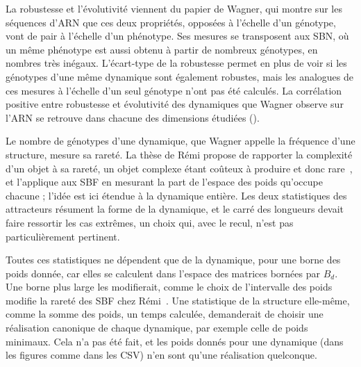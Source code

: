 \documentclass[12pt, a4paper]{article}
\begin{document}
La robustesse et l'évolutivité viennent du papier de Wagner, qui montre sur les séquences d'ARN que ces deux propriétés, opposées à l'échelle d'un génotype, vont de pair à l'échelle d'un phénotype.
Ses mesures se transposent aux SBN, où un même phénotype est aussi obtenu à partir de nombreux génotypes, en nombres très inégaux.
L'écart-type de la robustesse permet en plus de voir si les génotypes d'une même dynamique sont également robustes, mais les analogues de ces mesures à l'échelle d'un seul génotype n'ont pas été calculés.
La corrélation positive entre robustesse et évolutivité des dynamiques que Wagner observe sur l'ARN se retrouve dans chacune des dimensions étudiées ().

Le nombre de génotypes d'une dynamique, que Wagner appelle la fréquence d'une structure, mesure sa rareté.
La thèse de Rémi propose de rapporter la complexité d'un objet à sa rareté, un objet complexe étant coûteux à produire et donc rare~\cite{segretain2023}, et l'applique aux SBF en mesurant la part de l'espace des poids qu'occupe chacune ; l'idée est ici étendue à la dynamique entière.
Les deux statistiques des attracteurs résument la forme de la dynamique, et le carré des longueurs devait faire ressortir les cas extrêmes, un choix qui, avec le recul, n'est pas particulièrement pertinent.

Toutes ces statistiques ne dépendent que de la dynamique, pour une borne des poids donnée, car elles se calculent dans l'espace des matrices bornées par $B_d$.
Une borne plus large les modifierait, comme le choix de l'intervalle des poids modifie la rareté des SBF chez Rémi~\cite{segretain2023}.
Une statistique de la structure elle-même, comme la somme des poids, un temps calculée, demanderait de choisir une réalisation canonique de chaque dynamique, par exemple celle de poids minimaux.
Cela n'a pas été fait, et les poids donnés pour une dynamique (dans les figures comme dans les CSV) n'en sont qu'une réalisation quelconque.
\end{document}
